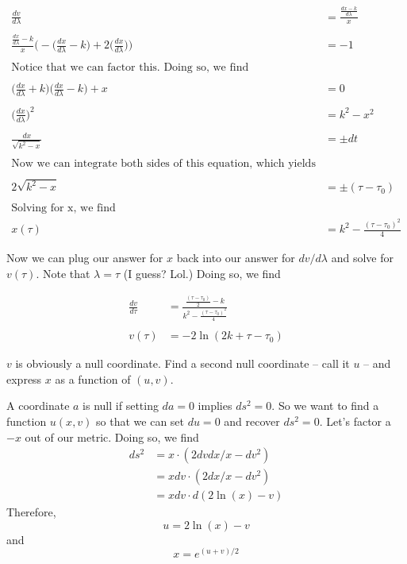 \documentclass[11pt,largemargins]{homework}
\begin{document}
\begin{alphaparts}
\begin{subequations}
\begin{align*}
\frac{dv}{d\lambda} &= \frac{\frac{dx - k}{d\lambda}}{x} \\ \\
\frac{\frac{dx}{d\lambda}- k}{x} \bigg(-\big(\frac{dx}{d\lambda} - k\big) + 2\big(\frac{dx}{d\lambda}\big) \bigg) &= -1 \\ \\
\text{Notice that we can factor this.  Doing so, we find} \\ \\ 
\big(\frac{dx}{d\lambda} + k\big) \big(\frac{dx}{d\lambda} - k \big) + x &= 0 \\ \\
\big(\frac{dx}{d\lambda}\big)^2 &= k^2 - x^2 \\ \\
\frac{dx}{\sqrt{k^2 - x}} &= \pm dt \\ \\
\text{Now we can integrate both sides of this equation, which yields} \\ \\ 
2 \sqrt{k^2 - x} &= \pm (\tau - \tau_{0}) \\ \\
\text{Solving for x, we find} \\
x(\tau) &= k^2 - \frac{(\tau - \tau_0)^2}{4}
\end{align*}
\end{subequations}

Now we can plug our answer for $x$ back into our answer for $dv / d\lambda$ and solve for $v(\tau)$. Note that $\lambda = \tau$ (I guess?  Lol.) Doing so, we find

\begin{subequations}
\begin{align*}
\frac{dv}{d\tau} &= \frac{\frac{(\tau - \tau_0)}{2} - k}{k^2 - \frac{(\tau - \tau_0)^2}{4}} \\ \\ 
v(\tau) &= -2 \ln (2k + \tau - \tau_0)
\end{align*}
\end{subequations}

\questionpart
$v$ is obviously a null coordinate.  Find a second null coordinate -- call it $u$ -- and express $x$ as a function of $(u, v)$.

A coordinate $a$ is null if setting $da = 0$ implies $ds^2 = 0$. So we want to find a function $u(x,v)$ so that we can set $du = 0$ and recover $ds^2 = 0$.  Let's factor a $-x$ out of our metric.  Doing so, we find
\begin{subequations}
\begin{align*}
ds^2 &= x \cdot (2 dv dx/x - dv^2) \\ 
&= x dv \cdot (2 dx/x - dv^2) \\ 
&= x dv \cdot d(2\ln(x) - v)
\end{align*}
\end{subequations}
Therefore,
$$
u = 2 \ln(x) - v
$$
and
$$ x = e^{(u+v)/2} $$


\end{alphaparts}
\end{document}
